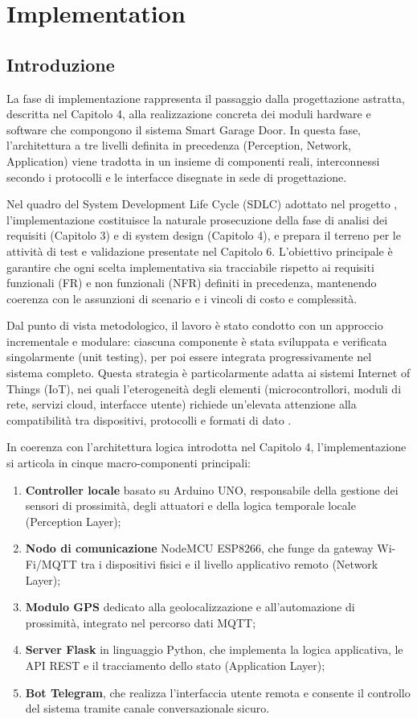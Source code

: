 \chapter{Implementation}

\section{Introduzione}
La fase di implementazione rappresenta il passaggio dalla progettazione astratta, descritta nel Capitolo 4, alla realizzazione concreta dei moduli hardware e software che compongono il sistema Smart Garage Door.
In questa fase, l'architettura a tre livelli definita in precedenza (Perception, Network, Application) viene tradotta in un insieme di componenti reali, interconnessi secondo i protocolli e le interfacce disegnate in sede di progettazione.

Nel quadro del System Development Life Cycle (SDLC) adottato nel progetto \cite{Pressman2019}, l'implementazione costituisce la naturale prosecuzione della fase di analisi dei requisiti (Capitolo 3) e di system design (Capitolo 4), e prepara il terreno per le attività di test e validazione presentate nel Capitolo 6. L'obiettivo principale è garantire che ogni scelta implementativa sia tracciabile rispetto ai requisiti funzionali (FR) e non funzionali (NFR) definiti in precedenza, mantenendo coerenza con le assunzioni di scenario e i vincoli di costo e complessità.

Dal punto di vista metodologico, il lavoro è stato condotto con un approccio incrementale e modulare: ciascuna componente è stata sviluppata e verificata singolarmente (unit testing), per poi essere integrata progressivamente nel sistema completo. Questa strategia è particolarmente adatta ai sistemi Internet of Things (IoT), nei quali l'eterogeneità degli elementi (microcontrollori, moduli di rete, servizi cloud, interfacce utente) richiede un'elevata attenzione alla compatibilità tra dispositivi, protocolli e formati di dato \cite{Tang2022}.

In coerenza con l'architettura logica introdotta nel Capitolo 4, l'implementazione si articola in cinque macro-componenti principali:
\begin{enumerate}
    \item \textbf{Controller locale} basato su Arduino UNO, responsabile della gestione dei sensori di prossimità, degli attuatori e della logica temporale locale (Perception Layer);
    \item \textbf{Nodo di comunicazione} NodeMCU ESP8266, che funge da gateway Wi-Fi/MQTT tra i dispositivi fisici e il livello applicativo remoto (Network Layer);
    \item \textbf{Modulo GPS} dedicato alla geolocalizzazione e all'automazione di prossimità, integrato nel percorso dati MQTT;
    \item \textbf{Server Flask} in linguaggio Python, che implementa la logica applicativa, le API REST e il tracciamento dello stato (Application Layer);
    \item \textbf{Bot Telegram}, che realizza l'interfaccia utente remota e consente il controllo del sistema tramite canale conversazionale sicuro.
\end{enumerate}

